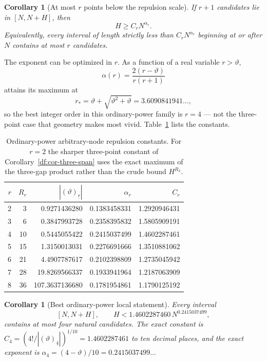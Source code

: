 \documentclass[11pt,oneside]{article}
\newtheorem{corollary}[theorem]{Corollary}
\theoremstyle{definition}
\theoremstyle{remark}
\newcommand{\thetaq}{\vartheta}
\newcommand{\fall}[2]{\left(#1\right)_{\!\underline{#2}}}
\begin{document}
\begin{corollary}[At most $r$ points below the repulsion scale]
\label{df:cor-r-packing}
If $r+1$ candidates lie in $[N,N+H]$, then
\begin{equation}
 H\ge C_rN^{\alpha_r}.
\label{df:r-span}
\end{equation}
Equivalently, every interval of length strictly less than $C_rN^{\alpha_r}$ beginning at or
after $N$ contains at most $r$ candidates.
\end{corollary}

The exponent can be optimized in $r$.  As a function of a real variable $r>\thetaq$,
\[
 \alpha(r)=\frac{2(r-\thetaq)}{r(r+1)}
\]
attains its maximum at
\[
 r_{\ast}=\thetaq+\sqrt{\thetaq^{2}+\thetaq}=3.6090841941\ldots,
\]
so the best integer order in this ordinary-power family is $r=4$ --- not the three-point case
that geometry makes most vivid.  Table~\ref{df:tab-ordinary-constants} lists the constants.

\begin{table}[ht]
\centering
\small
\begin{tabular}{rrrrr}
\toprule
$r$ & $R_r$ & $|\fall{\thetaq}{r}|$ & $\alpha_r$ & $C_r$ \\
\midrule
2 & 3  & 0.9271436280 & 0.1383458331 & 1.2920946431 \\
3 & 6  & 0.3847993728 & 0.2358395832 & 1.5805909191 \\
4 & 10 & 0.5445055422 & 0.2415037499 & 1.4602287461 \\
5 & 15 & 1.3150013031 & 0.2276691666 & 1.3510881062 \\
6 & 21 & 4.4907787617 & 0.2102398809 & 1.2735045942 \\
7 & 28 & 19.8269566337 & 0.1933941964 & 1.2187063909 \\
8 & 36 & 107.3637136680 & 0.1781954861 & 1.1790125192 \\
\bottomrule
\end{tabular}
\caption{Ordinary-power arbitrary-node repulsion constants.  For $r=2$ the sharper
three-point constant of Corollary~\ref{df:cor-three-span} uses the exact maximum of the
three-gap product rather than the crude bound $H^{R_2}$.}
\label{df:tab-ordinary-constants}
\end{table}

\begin{corollary}[Best ordinary-power local statement]
\label{df:cor-four-span}
Every interval
\[
 [N,N+H],
 \qquad H<1.4602287460\,N^{0.2415037499},
\]
contains at most four natural candidates.  The exact constant is
$C_4=(4!/|\fall{\thetaq}{4}|)^{1/10}=1.4602287461$ to ten decimal places, and the exact
exponent is $\alpha_4=(4-\thetaq)/10=0.2415037499\ldots$
\end{corollary}
\end{document}
